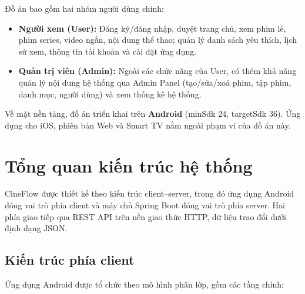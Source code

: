 Đồ án bao gồm hai nhóm người dùng chính:

\begin{itemize}
    \item \textbf{Người xem (User):} Đăng ký/đăng nhập, duyệt trang chủ, xem phim lẻ,
    phim series, video ngắn, nội dung thể thao; quản lý danh sách yêu thích, lịch sử xem,
    thông tin tài khoản và cài đặt ứng dụng.

    \item \textbf{Quản trị viên (Admin):} Ngoài các chức năng của User, có thêm khả năng
    quản lý nội dung hệ thống qua Admin Panel (tạo/sửa/xoá phim, tập phim, danh mục,
    người dùng) và xem thống kê hệ thống.
\end{itemize}

Về mặt nền tảng, đồ án triển khai trên \textbf{Android} (minSdk 24, targetSdk 36).
Ứng dụng cho iOS, phiên bản Web và Smart TV nằm ngoài phạm vi của đồ án này.


\section{Tổng quan kiến trúc hệ thống}
\label{sec:tong_quan_kien_truc}

CineFlow được thiết kế theo kiến trúc client--server, trong đó ứng dụng Android đóng vai
trò phía client và máy chủ Spring Boot đóng vai trò phía server. Hai phía giao tiếp qua
REST API trên nền giao thức HTTP, dữ liệu trao đổi dưới định dạng JSON.

\subsection{Kiến trúc phía client}
\label{subsec:kien_truc_client}

Ứng dụng Android được tổ chức theo mô hình phân lớp, gồm các tầng chính:


